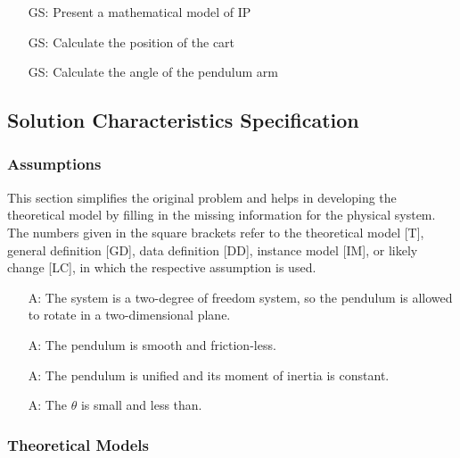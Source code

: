 \documentclass[12pt]{article}
\newcounter{assumpnum} %
\newcounter{goalnum} %
\begin{document}
\begin{itemize}
\item[GS\refstepcounter{goalnum}\thegoalnum \label{G_model}:]
Present a mathematical model of IP
\item[GS\refstepcounter{goalnum}\thegoalnum \label{G_calPosition}:]
Calculate the position of the cart
\item[GS\refstepcounter{goalnum}\thegoalnum \label{G_calTheta}:]
Calculate the angle of the pendulum arm
\end{itemize}

\subsection{Solution Characteristics Specification}


\subsubsection{Assumptions} \label{sec_assumpt}

This section simplifies the original problem and helps in developing the
theoretical model by filling in the missing information for the physical
system. The numbers given in the square brackets refer to the theoretical model
[T], general definition [GD], data definition [DD], instance model [IM], or
likely change [LC], in which the respective assumption is used.

\begin{itemize}

\item[A\refstepcounter{assumpnum}\theassumpnum \label{A_systemdimension}:]
The system is a two-degree of freedom system, so the pendulum is allowed to rotate in a two-dimensional plane.
\item[A\refstepcounter{assumpnum}\theassumpnum \label{A_pendfrictionl}:]
The pendulum is smooth and friction-less.
\item[A\refstepcounter{assumpnum}\theassumpnum \label{A_pendulumInertia}:]
The pendulum is unified and its moment of inertia is constant.
\item[A\refstepcounter{assumpnum}\theassumpnum \label{A_cosTheta}:]
The $\theta$ is small and less than.

\end{itemize}


\subsubsection{Theoretical Models}\label{sec_theoretical}
\end{document}
